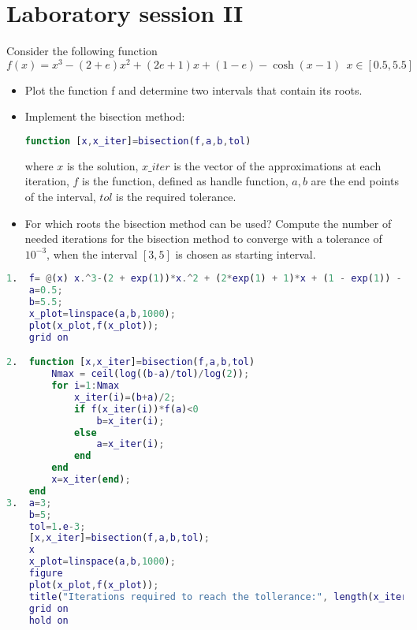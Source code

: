 \documentclass[12pt, a4paper]{report}
\newtheorem[style=M,bodystyle=\normalfont]{theorem}{Theorem}
\newtheorem[style=M,bodystyle=\normalfont]{corollary}{Corollary}
\newtheorem[style=M,bodystyle=\normalfont]{lemma}{Lemma}
\newtheorem[style=M,bodystyle=\normalfont]{definition}{Definition}
\begin{document}
\chapter{Laboratory session II}
    \begin{Exercise}[label=7]
        Consider the following function
        \[f(x) = x^3-(2+e)x^2+(2e+1)x+(1-e)-\cosh(x-1) \:\: x \in [0.5, 5.5]\]
        \begin{itemize}
            \item Plot the function f and determine two intervals that contain its roots.
            \item Implement the bisection method:
                \begin{lstlisting}[language=Matlab]
function [x,x_iter]=bisection(f,a,b,tol)
                \end{lstlisting}
                where $x$ is the solution, $x\_iter$ is the vector of the approximations at each iteration, $f$ is the function, defined as handle function, $a,b$ are the end points 
                of the interval, $tol$ is the required tolerance.
            \item For which roots the bisection method can be used? Compute the number of needed iterations for the bisection method to converge with a tolerance of $10^{-3}$, 
                when the interval $[3, 5]$ is chosen as starting interval.
        \end{itemize}
    \end{Exercise}
    \begin{Answer}[ref=7]
        \begin{lstlisting}[language=Matlab]
1.  f= @(x) x.^3-(2 + exp(1))*x.^2 + (2*exp(1) + 1)*x + (1 - exp(1)) - cosh(x - 1);
    a=0.5;
    b=5.5;
    x_plot=linspace(a,b,1000);
    plot(x_plot,f(x_plot));
    grid on

2.  function [x,x_iter]=bisection(f,a,b,tol)
        Nmax = ceil(log((b-a)/tol)/log(2));
        for i=1:Nmax
            x_iter(i)=(b+a)/2;
            if f(x_iter(i))*f(a)<0
                b=x_iter(i);
            else
                a=x_iter(i);
            end
        end
        x=x_iter(end);
    end
3.  a=3;
    b=5;
    tol=1.e-3;
    [x,x_iter]=bisection(f,a,b,tol);
    x
    x_plot=linspace(a,b,1000);
    figure
    plot(x_plot,f(x_plot));
    title("Iterations required to reach the tollerance:", length(x_iter))
    grid on
    hold on
        \end{lstlisting}  
    \end{Answer}
\end{document}
